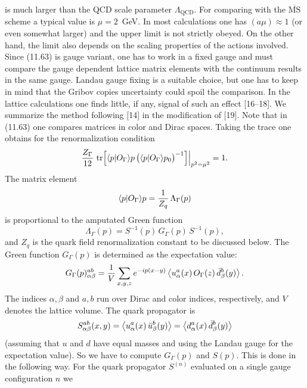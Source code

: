 is much larger than the QCD scale parameter $\Lambda_{\mathrm{QCD}}$. For comparing with the
$\overline{\mathrm{MS}}$ scheme a typical value is $\mu = 2$~GeV. In most calculations one has $(a\mu) \approx 1$
(or even somewhat larger) and the upper limit is not strictly obeyed. On the
other hand, the limit also depends on the scaling properties of the actions
involved.
Since (11.63) is gauge variant, one has to work in a fixed gauge and must
compare the gauge dependent lattice matrix elements with the continuum
results in the same gauge. Landau gauge fixing is a suitable choice, but one has
to keep in mind that the Gribov copies uncertainty could spoil the comparison.
In the lattice calculations one finds little, if any, signal of such an effect [16--18].
We summarize the method following [14] in the modification of [19]. Note
that in (11.63) one compares matrices in color and Dirac spaces. Taking the
trace one obtains for the renormalization condition
\begin{equation}
\frac{Z_\Gamma}{12}\,
\operatorname{tr}\Bigl[\langle p|O_\Gamma\rangle{p}\,\bigl(\langle p|O_\Gamma\rangle{p}_0\bigr)^{-1}\Bigr]
\Big|_{p^2 = \mu^2} = 1 .
\end{equation}
The matrix element
\begin{equation}
\langle p|O_\Gamma\rangle{p} = \frac{1}{Z_q}\,\Lambda_\Gamma(p)
\end{equation}
is proportional to the amputated Green function
\begin{equation}
\Lambda_\Gamma(p) = S^{-1}(p)\, G_\Gamma(p)\, S^{-1}(p) ,
\end{equation}
and $Z_q$ is the quark field renormalization constant to be discussed below. The
Green function $G_\Gamma(p)$ is determined as the expectation value:
\begin{equation}
G_\Gamma(p)_{\alpha\beta}^{ab} =
\frac{1}{V}\sum_{x,y,z} e^{-ip(x-y)}
\left\langle u_\alpha^a(x)\, O_\Gamma(z)\, \bar{d}_\beta^b(y) \right\rangle .
\end{equation}
The indices $\alpha, \beta$ and $a, b$ run over Dirac and color indices, respectively, and
$V$ denotes the lattice volume. The quark propagator is
\begin{equation}
S_{\alpha\beta}^{ab}(x, y) = \left\langle u_\alpha^a(x)\, \bar{u}_\beta^b(y) \right\rangle
= \left\langle d_\alpha^a(x)\, \bar{d}_\beta^b(y) \right\rangle
\end{equation}
(assuming that $u$ and $d$ have equal masses and using the Landau gauge for
the expectation value).
So we have to compute $G_\Gamma(p)$ and $S(p)$. This is done in the following way.
For the quark propagator $S^{(n)}$ evaluated on a single gauge configuration $n$ we
